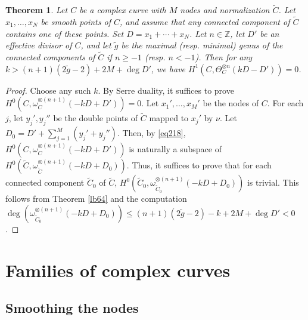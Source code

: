 \documentclass[12pt,a4paper,notitlepage]{report}
\theoremstyle{definition}
\theoremstyle{plain}
\newtheorem{thm}[df]{Theorem}
\newcommand{\wtd}{\widetilde}
\newcommand{\Zbb}{\mathbb Z}
\numberwithin{equation}{section}
\begin{document}
\begin{thm}\label{lb10}
Let $C$ be a complex curve with $M$ nodes and normalization $\wtd C$. Let $x_1,\dots,x_N$ be smooth points of $C$, and assume that any connected component of $\wtd C$ contains one of these points. Set $D=x_1+\cdots+x_N$. Let $n\in\Zbb$, let $D'$ be an effective divisor of $C$,  and let $\wtd g$ be the maximal (resp. minimal) genus of the connected components of $\wtd C$ if $n\geq -1$ (resp. $n<-1$). Then for any $k>(n+1)(2\wtd g-2)+2M+\deg D'$, we have $H^1(C,\Theta_C^{\otimes n}(kD-D'))=0$.
\end{thm}


\begin{proof}
Choose any such $k$. By Serre duality, it suffices to prove $H^0(C,\omega_C^{\otimes(n+1)}(-kD+D'))=0$. Let $x_1',\dots,x_M'$ be the nodes of $C$. For each $j$, let $y_j',y_j''$ be the double points of $\wtd C$ mapped to $x_j'$ by $\nu$. Let $D_0=D'+\sum_{j=1}^M(y_j'+y_j'')$. Then, by \eqref{eq218}, $H^0(C,\omega_C^{\otimes(n+1)}(-kD+D'))$ is naturally a subspace of $H^0(\wtd C,\omega_{\wtd C}^{\otimes(n+1)}(-kD+D_0))$. Thus, it suffices to prove that for each connected component $\wtd C_0$ of $\wtd C$,  $H^0(\wtd C_0,\omega_{\wtd C_0}^{\otimes(n+1)}(-kD+D_0))$ is trivial. This follows from Theorem \ref{lb64} and the computation $\deg(\omega_{\wtd C_0}^{\otimes(n+1)}(-kD+D_0))\leq (n+1)(2\wtd g-2)-k+2M+\deg D'<0$. 
\end{proof}






\section{Families of complex curves}\label{lb24}

\subsection*{Smoothing the nodes}
\end{document}
